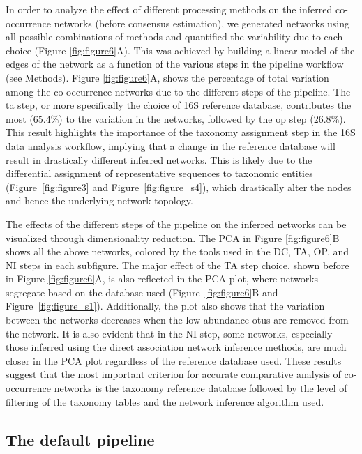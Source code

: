   In order to analyze the effect of different processing methods on the inferred co-occurrence networks (before consensus estimation), we generated networks using all possible combinations of methods and quantified the variability due to each choice (Figure \ref{fig:figure6}A).
 This was achieved by building a linear model of the edges of the network as a function of the various steps in the pipeline workflow (see Methods).
  Figure \ref{fig:figure6}A, shows the percentage of total variation among the co-occurrence networks due to the different steps of the pipeline.
  The \ac{ta} step, or more specifically the choice of 16S reference database, contributes the most ($65.4\%$) to the variation in the networks, followed by the \ac{op} step ($26.8\%$).
  This result highlights the importance of the taxonomy assignment step in the 16S data analysis workflow, implying that a change in the reference database will result in drastically different inferred networks.
  This is likely due to the differential assignment of representative sequences to taxonomic entities (Figure~\ref{fig:figure3} and Figure~\ref{fig:figure_s4}), which drastically alter the nodes and hence the underlying network topology.

  The effects of the different steps of the pipeline on the inferred networks can be visualized through dimensionality reduction.
  The PCA in Figure \ref{fig:figure6}B shows all the above networks, colored by the tools used in the DC, TA, OP, and NI steps in each subfigure.
  The major effect of the TA step choice, shown before in Figure \ref{fig:figure6}A, is also reflected in the PCA plot, where networks segregate based on the database used (Figure~\ref{fig:figure6}B and Figure~\ref{fig:figure_s1}).
  Additionally, the plot also shows that the variation between the networks decreases when the low abundance \ac{otu}s are removed from the network.
  It is also evident that in the NI step, some networks, especially those inferred using the direct association network inference methods, are much closer in the PCA plot regardless of the reference database used.
  These results suggest that the most important criterion for accurate comparative analysis of co-occurrence networks is the taxonomy reference database followed by the level of filtering of the taxonomy tables and the network inference algorithm used.

  \FloatBarrier

  \subsection*{The default pipeline}

